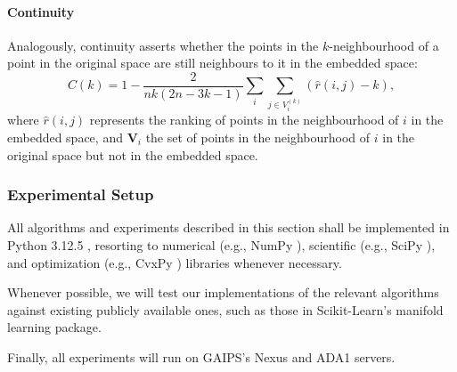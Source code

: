 \paragraph{Continuity} \cite{t&c} Analogously, continuity asserts whether the points in the $k$-neighbourhood of a point in the original space are still neighbours to it in the embedded space:
\begin{equation}
    C(k) = 1 - \frac{2}{nk(2n-3k-1)} \sum_i \sum_{j\in V_i^{(k)}} (\hat{r}(i,j) - k),
\end{equation}
where $\hat{r}(i,j)$ represents the ranking of points in the neighbourhood of $i$ in the embedded space, and $\bm{V}_i$ the set of points in the neighbourhood of $i$ in the original space but not in the embedded space.



\subsubsection{Experimental Setup}
All algorithms and experiments described in this section shall be implemented in Python 3.12.5 \cite{python}, resorting to numerical (e.g., NumPy \cite{numpy}), scientific (e.g., SciPy \cite{scipy}), and optimization (e.g., CvxPy \cite{cvxpy,cvxpy-upgrade}) libraries whenever necessary.

Whenever possible, we will test our implementations of the relevant algorithms against existing publicly available ones, such as those in Scikit-Learn's \cite{scikit-learn} manifold learning package.

Finally, all experiments will run on GAIPS's Nexus and ADA1 servers.

